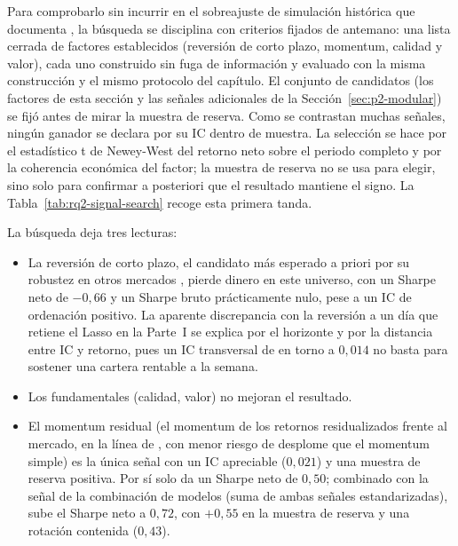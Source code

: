 Para comprobarlo sin incurrir en el sobreajuste de simulación histórica que documenta
\textcite{deprado2018advances}, la búsqueda se disciplina con criterios fijados de
antemano: una lista cerrada de factores establecidos (reversión de corto plazo, momentum,
calidad y valor), cada uno construido sin fuga de información y evaluado con la misma
construcción y el mismo protocolo del capítulo. El conjunto de candidatos (los factores de
esta sección y las señales adicionales de la Sección~\ref{sec:p2-modular}) se fijó antes
de mirar la muestra de reserva. Como se contrastan muchas señales, ningún ganador se
declara por su IC dentro de muestra. La selección se hace por el estadístico t de
Newey-West \autocite{neweywest1987} del retorno neto sobre el periodo completo y por la
coherencia económica del factor; la muestra de reserva no se usa para elegir, sino solo
para confirmar a posteriori que el resultado mantiene el signo. La
Tabla~\ref{tab:rq2-signal-search} recoge esta primera tanda.



La búsqueda deja tres lecturas:

\begin{itemize}
  \item La reversión de corto plazo, el candidato más esperado a priori por su robustez en
  otros mercados \autocite{jegadeesh1990evidence}, pierde dinero en este universo, con un
  Sharpe neto de $-0{,}66$ y un Sharpe bruto prácticamente nulo, pese a un IC de
  ordenación positivo. La aparente discrepancia con la reversión a un día que retiene el
  Lasso en la Parte~I se explica por el horizonte y por la distancia entre IC y retorno,
  pues un IC transversal de en torno a $0{,}014$ no basta para sostener una cartera rentable a
  la semana.
  \item Los fundamentales (calidad, valor) no mejoran el resultado.
  \item El momentum residual (el momentum de los retornos residualizados frente al
  mercado, en la línea de \textcite{blitz2011residual}, con menor riesgo de desplome que
  el momentum simple) es la única señal con un IC apreciable ($0{,}021$) y una muestra de
  reserva positiva. Por sí solo da un Sharpe neto de $0{,}50$; combinado con la señal de
  la combinación de modelos (suma de ambas señales estandarizadas), sube el Sharpe neto a
  $0{,}72$, con $+0{,}55$ en la muestra de reserva y una rotación contenida ($0{,}43$).
\end{itemize}

